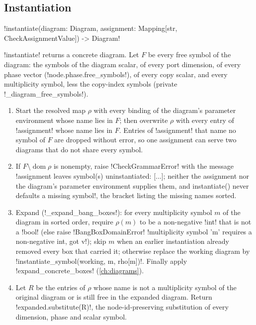 \subsection{Instantiation}

\begin{signature}
\py!instantiate(diagram: Diagram, assignment: Mapping[str, CheckAssignmentValue]) -> Diagram!
\end{signature}

\py!instantiate! returns a concrete diagram. Let $F$ be every free symbol of the diagram: the symbols of the diagram scalar, of every port dimension, of every phase vector (\py!node.phase.free_symbols!), of every copy scalar, and every multiplicity symbol, less the copy-index symbols (private \py!_diagram_free_symbols!).

\begin{algorithm}[Instantiation]\label{alg:proofs-instantiate}
\leavevmode
\begin{enumerate}
\item Start the resolved map $\rho$ with every binding of the diagram's parameter environment whose name lies in $F$; then overwrite $\rho$ with every entry of \py!assignment! whose name lies in $F$. Entries of \py!assignment! that name no symbol of $F$ are dropped without error, so one assignment can serve two diagrams that do not share every symbol.
\item If $F\setminus\operatorname{dom}\rho$ is nonempty, raise \py!CheckGrammarError! with the message \code!assignment leaves symbol(s) uninstantiated: [...]; neither the assignment nor the diagram's parameter environment supplies them, and instantiate() never defaults a missing symbol!, the bracket listing the missing names sorted.
\item Expand \bboxes{} (\py!_expand_bang_boxes!): for every multiplicity symbol $m$ of the diagram in sorted order, require $\rho(m)$ to be a non-negative \py!int! that is not a \py!bool! (else raise \py!BangBoxDomainError! \code!multiplicity symbol 'm' requires a non-negative int, got v!); skip $m$ when an earlier instantiation already removed every box that carried it; otherwise replace the working diagram by \py!instantiate_symbol(working, m, rho[m])!. Finally apply \py!expand_concrete_boxes! (\cref{ch:diagrams}).
\item Let $R$ be the entries of $\rho$ whose name is not a multiplicity symbol of the original diagram or is still free in the expanded diagram. Return \py!expanded.substitute(R)!, the node-id-preserving substitution of every dimension, phase and scalar symbol.
\end{enumerate}
\end{algorithm}

